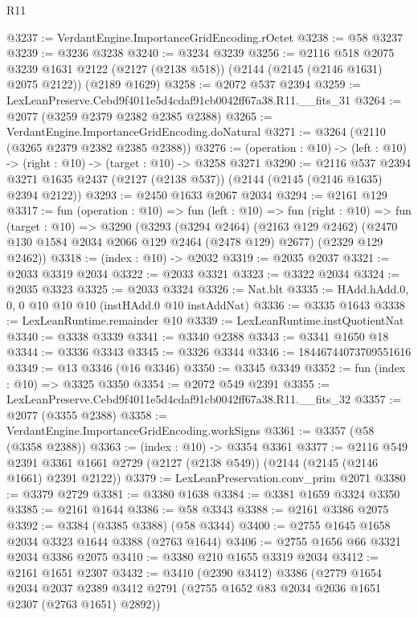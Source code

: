 \begin{lexlean}{R11}
\begin{coremodule}
@3237 := VerdantEngine.ImportanceGridEncoding.rOctet
@3238 := @58 @3237
@3239 := @3236 @3238
@3240 := @3234 @3239
@3256 := @2116
    @518
    @2075
    @3239
    @1631
    @2122
    (@2127 (@2138 @518))
    (@2144 (@2145 (@2146 @1631) @2075 @2122))
    (@2189 @1629)
@3258 := @2072 @537 @2394
@3259 := LexLeanPreserve.Cebd9f4011e5d4cdaf91cb0042ff67a38.R11.__fits_31
@3264 := @2077 (@3259 @2379 @2382 @2385 @2388)
@3265 := VerdantEngine.ImportanceGridEncoding.doNatural
@3271 := @3264 (@2110 (@3265 @2379 @2382 @2385 @2388))
@3276 := (operation : @10) -> (left : @10) -> (right : @10) -> (target : @10) -> @3258 @3271
@3290 := @2116
    @537
    @2394
    @3271
    @1635
    @2437
    (@2127 (@2138 @537))
    (@2144 (@2145 (@2146 @1635) @2394 @2122))
@3293 := @2450 @1633 @2067 @2034
@3294 := @2161 @129
@3317 := fun (operation : @10) =>
  fun (left : @10) =>
  fun (right : @10) =>
  fun (target : @10) =>
  @3290
    (@3293
      (@3294 @2464)
      (@2163 @129 @2462)
      (@2470 @130 @1584 @2034 @2066 @129 @2464 (@2478 @129) @2677)
      (@2329 @129 @2462))
@3318 := (index : @10) -> @2032
@3319 := @2035 @2037
@3321 := @2033 @3319 @2034
@3322 := @2033 @3321
@3323 := @3322 @2034
@3324 := @2035 @3323
@3325 := @2033 @3324
@3326 := Nat.blt
@3335 := HAdd.hAdd.{0, 0, 0} @10 @10 @10 (instHAdd.{0} @10 instAddNat)
@3336 := @3335 @1643
@3338 := LexLeanRuntime.remainder @10
@3339 := LexLeanRuntime.instQuotientNat
@3340 := @3338 @3339
@3341 := @3340 @2388
@3343 := @3341 @1650 @18
@3344 := @3336 @3343
@3345 := @3326 @3344
@3346 := 18446744073709551616
@3349 := @13 @3346 (@16 @3346)
@3350 := @3345 @3349
@3352 := fun (index : @10) => @3325 @3350
@3354 := @2072 @549 @2391
@3355 := LexLeanPreserve.Cebd9f4011e5d4cdaf91cb0042ff67a38.R11.__fits_32
@3357 := @2077 (@3355 @2388)
@3358 := VerdantEngine.ImportanceGridEncoding.workSigns
@3361 := @3357 (@58 (@3358 @2388))
@3363 := (index : @10) -> @3354 @3361
@3377 := @2116
    @549
    @2391
    @3361
    @1661
    @2729
    (@2127 (@2138 @549))
    (@2144 (@2145 (@2146 @1661) @2391 @2122))
@3379 := LexLeanPreservation.conv_prim @2071
@3380 := @3379 @2729
@3381 := @3380 @1638
@3384 := @3381 @1659 @3324 @3350
@3385 := @2161 @1644
@3386 := @58 @3343
@3388 := @2161 @3386 @2075
@3392 := @3384 (@3385 @3388) (@58 @3344)
@3400 := @2755 @1645 @1658 @2034 @3323 @1644 @3388 (@2763 @1644)
@3406 := @2755 @1656 @66 @3321 @2034 @3386 @2075
@3410 := @3380 @210 @1655 @3319 @2034
@3412 := @2161 @1651 @2307
@3432 := @3410
    (@2390 @3412)
    @3386
    (@2779
      @1654
      @2034
      @2037
      @2389
      @3412
      @2791
      (@2755 @1652 @83 @2034 @2036 @1651 @2307 (@2763 @1651) @2892))

\end{coremodule}
\end{lexlean}
